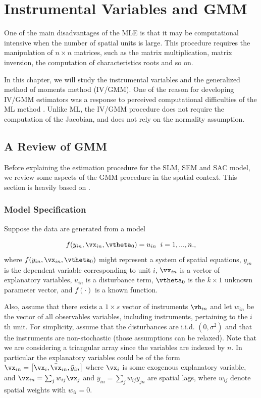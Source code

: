 \documentclass[english,12pt]{book}\usepackage[]{graphicx}\usepackage[]{xcolor}
\begin{document}
\chapter{Instrumental Variables and GMM}

One of the main disadvantages of the MLE is that it may be computational intensive when the number of spatial units is large. This procedure requires the manipulation of $n \times n$ matrices, such as the matrix multiplication, matrix inversion, the computation of characteristics roots and so on. 

In this chapter, we will study the instrumental variables and the generalized method of moments method (IV/GMM).  One of the reason for developing IV/GMM estimators was a response to perceived computational difficulties of the ML method \citep{kelejian1998generalized, kelejian1999generalized}.  Unlike ML, the IV/GMM procedure does not require the computation of the Jacobian, and does not rely on the normality assumption.

\section{A Review of GMM}

Before explaining the estimation procedure for the SLM, SEM and SAC model, we review some aspects of the GMM procedure in the spatial context. This section is heavily based on \cite{pruchaHB}.

\subsection{Model Specification}

Suppose the data are generated from a model

\begin{equation*}
f(y_{in}, \vx_{in}, \vtheta_0) = u_{in}\;\;i = 1,...,n. , 
\end{equation*}
%
where $f(y_{in}, \vx_{in}, \vtheta_0)$ might represent a system of spatial equations, $y_{in}$ is the dependent variable corresponding to unit $i$, $\vx_{in}$ is a vector of explanatory variables, $u_{in}$ is a disturbance term, $\vtheta_0$ is the $k \times 1$ unknown parameter vector, and $f(\cdot)$ is a known function. 


Also, assume that there exists a $1 \times s$ vector of instruments $\vh_{in}$ and let $w_{in}$ be the vector of all observables variables, including instruments, pertaining to the $i$th unit. For simplicity, assume that the disturbances are i.i.d. $(0, \sigma^2)$ and that the instruments are non-stochastic (those assumptions can be relaxed). Note that we are considering a triangular array since the variables are indexed by $n$. In particular the explanatory variables could be of the form $\vx_{in} = \left[\vx_i, \bar{\vx}_{in}, \bar{y}_{in} \right]$ where $\vx_i$ is some exogenous explanatory variable, and $\bar{\vx}_{in} = \sum_jw_{ij}\vx_j$ and $\bar{y}_{in} = \sum_jw_{ij}y_{jn}$ are spatial lags, where $w_{ij}$ denote spatial weights with $w_{ii} = 0$. 
\end{document}
